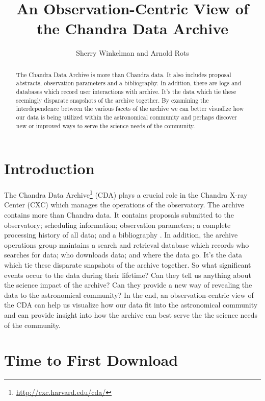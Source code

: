 
\resetcounters


\title{An Observation-Centric View of the Chandra Data Archive}
\author{Sherry Winkelman and Arnold Rots}


\begin{abstract}
The Chandra Data Archive is more than Chandra data. It also includes proposal abstracts, observation parameters and a bibliography.  In addition, there are logs and databases which record user interactions with archive.  It's the data which tie these seemingly disparate snapshots of the archive together.  By examining the interdependence between the various facets of the archive we can better visualize how our data is being utilized within the astronomical community and perhaps discover new or improved ways to serve the science needs of the community.

\end{abstract}

\section{Introduction}
The Chandra Data Archive\footnote{\url{http://cxc.harvard.edu/cda/}} (CDA) plays a crucial role in the Chandra X-ray Center (CXC) which manages the operations of the observatory.  The archive contains more than Chandra data.  It contains proposals submitted to the observatory; scheduling information; observation parameters; a complete processing history of all data; and a bibliography .  In addition, the archive operations group maintains a search and retrieval database which records who searches for data; who downloads data; and where the data go.  It's the data which tie these disparate snapshots of the archive together.  So what significant events occur to the data during their lifetime? Can they tell us anything about the science impact of the archive? Can they provide a new way of revealing the data to the astronomical community?  In the end, an observation-centric view of the CDA can help us visualize how our data fit into the astronomical community and can provide insight into how the archive can best serve the the science needs of the community.

\section{Time to First Download}
\label{sec:Time2FirstDownload}

